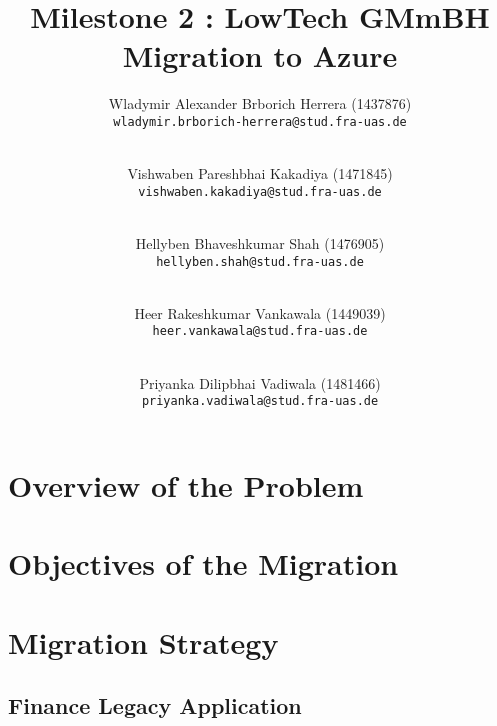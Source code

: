 \documentclass{llncs}
\newcommand{\what}{Milestone 2 : LowTech GMmBH Migration to Azure}
\begin{document}
%
%
%
\mainmatter              %
%
\title{\what}
%
\author{
    Wladymir Alexander Brborich Herrera (1437876)\\
    \texttt{wladymir.brborich-herrera@stud.fra-uas.de}
    \and\\
    Vishwaben Pareshbhai Kakadiya (1471845)\\
    \texttt{vishwaben.kakadiya@stud.fra-uas.de}
    \and\\
    Hellyben Bhaveshkumar Shah (1476905)\\
    \texttt{hellyben.shah@stud.fra-uas.de}
    \and\\
    Heer Rakeshkumar Vankawala (1449039)
    \\
    \texttt{heer.vankawala@stud.fra-uas.de}
    \and\\
    Priyanka Dilipbhai Vadiwala (1481466)\\
    \texttt{priyanka.vadiwala@stud.fra-uas.de}
}
%

\maketitle              %

\begin{abstract}

\end{abstract}

\section{Overview of the Problem}


\section{Objectives of the Migration}

\section{Migration Strategy}

\subsection{Finance	Legacy Application}
\end{document}

